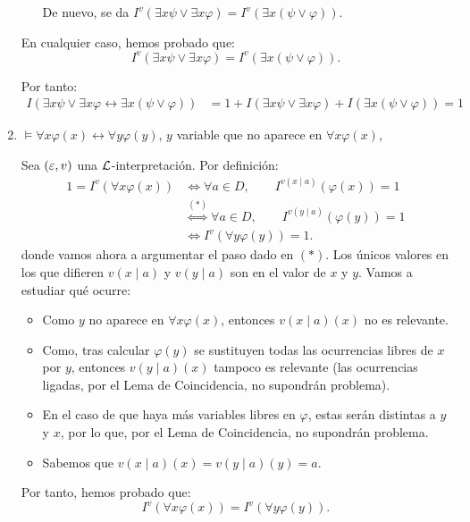 \begin{ejercicio}
\begin{enumerate}
\begin{itemize}
            De nuevo, se da $I^v(\exists x \psi \vee \exists x \varphi) = I^v(\exists x(\psi \vee \varphi))$.
        \end{itemize}

        En cualquier caso, hemos probado que:
        \begin{equation*}
            I^v(\exists x \psi \vee \exists x \varphi) = I^v(\exists x(\psi \vee \varphi)).
        \end{equation*}

        Por tanto:
        \begin{align*}
            I( \exists x \psi \vee \exists x \varphi \leftrightarrow \exists x(\psi \vee \varphi))
            &= 1+I(\exists x \psi \vee \exists x \varphi)+I(\exists x(\psi \vee \varphi))=1
        \end{align*}


        \item $\models \forall x \varphi(x) \leftrightarrow \forall y \varphi(y)$, $y$ variable que no aparece en $\forall x \varphi(x)$,
        
        Sea $(\varepsilon,v)$ una $\mathcal{L}$-interpretación. Por definición:
        \begin{align*}
            1 = I^v(\forall x \varphi(x))
            &\iff \forall a\in D,\qquad I^{v(x\mid a)}(\varphi(x)) = 1\\
            &\stackrel{(\ast)}{\iff} \forall a\in D,\qquad I^{v(y\mid a)}(\varphi(y)) = 1\\
            &\iff I^v(\forall y \varphi(y)) = 1.
        \end{align*}
        donde vamos ahora a argumentar el paso dado en $(\ast)$. Los únicos valores en los que difieren $v(x\mid a)$ y $v(y\mid a)$ son en el valor de $x$ y $y$. Vamos a estudiar qué ocurre:
        \begin{itemize}
            \item Como $y$ no aparece en $\forall x \varphi(x)$, entonces $v(x\mid a)(x)$ no es relevante.
            \item Como, tras calcular $\varphi(y)$ se sustituyen todas las ocurrencias libres de $x$ por $y$, entonces $v(y\mid a)(x)$ tampoco es relevante (las ocurrencias ligadas, por el Lema de Coincidencia, no supondrán problema).
            \item En el caso de que haya más variables libres en $\varphi$, estas serán distintas a $y$ y $x$, por lo que, por el Lema de Coincidencia, no supondrán problema.
            \item Sabemos que $v(x\mid a)(x) = v(y\mid a)(y)=a$.
        \end{itemize}
        Por tanto, hemos probado que:
        \begin{equation*}
            I^v(\forall x \varphi(x)) = I^v(\forall y \varphi(y)).
        \end{equation*}


\end{enumerate}
\end{ejercicio}
